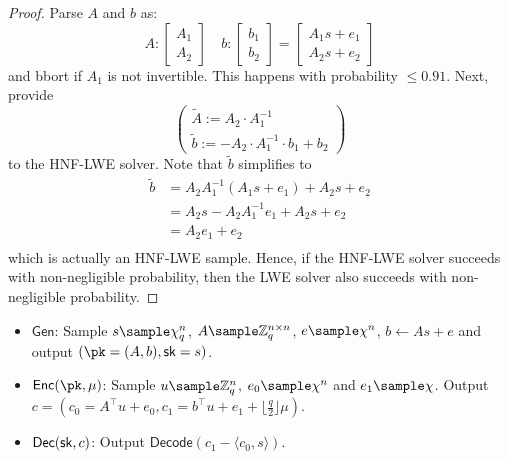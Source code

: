 \documentclass[12pt]{tufte-book}
\newcommand{\Gen}{\mathsf{Gen}}
\newcommand{\Enc}{\mathsf{Enc}}
\newcommand{\Dec}{\mathsf{Dec}}
\newcommand{\LWE}{\mathsf{LWE}} \usepackage{booktabs}
\begin{document}
\begin{lemma}[$\LWE_{n,q,\chi,m} \leq \mathsf{HNF-LWE}_{n,q,\chi,m-n}$]
\end{lemma}
\begin{proof}
    Parse $A$ and $b$ as:
    \[A:\begin{bmatrix} A_1 \\ A_2 \end{bmatrix} \quad b:\begin{bmatrix} b_1 \\ b_2 \end{bmatrix} = \begin{bmatrix} A_1 s + e_1 \\ A_2 s + e_2 \end{bmatrix}\]
    and bbort if $A_1$ is not invertible. This happens with probability $\le 0.91$. Next, provide
    \[\begin{pmatrix} \tilde{A} := A_2 \cdot A_1^{-1} \\ \tilde{b} := -A_2 \cdot A_1^{-1} \cdot b_1 + b_2 \end{pmatrix}\] to the HNF-LWE solver. Note that $\tilde{b}$ simplifies to
    \begin{equation*}
        \begin{aligned}
            \tilde{b} & = A_2 A_1^{-1} (A_1 s + e_1) + A_2 s + e_2 \\
                      & = A_2 s - A_2 A_1^{-1} e_1 + A_2 s + e_2   \\
                      & = A_2 e_1 + e_2                            \\
        \end{aligned}
    \end{equation*}
    which is actually an HNF-LWE sample. Hence, if the HNF-LWE solver succeeds with non-negligible probability, then the LWE solver also succeeds with non-negligible probability.
\end{proof}

\begin{construction}
    \hfill
    \begin{itemize}
        \item $\Gen$: Sample $s \sample \chi_q^n$, $A \sample \mathbb{Z}_q^{n \times n}$, $e \sample \chi^n$, $b \gets As + e$ and output $(\pk = (A,b), \sk = s)$.
        \item $\Enc(\pk, \mu)$: Sample $u \sample \mathbb{Z}_q^n$, $e_0 \sample \chi^n$ and $e_1 \sample \chi$. Output $c = (c_0 = A^\intercal u + e_0,c_1 =  b^\intercal u + e_1 + \lfloor\frac{q}{2}\rfloor\mu)$.
        \item $\Dec(\sk, c)$: Output $\mathsf{Decode}(c_1 - \langle c_0, s\rangle)$.
    \end{itemize}
\end{construction}
\end{document}
